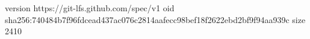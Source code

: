 version https://git-lfs.github.com/spec/v1
oid sha256:740484b7f96fdcead437ac076c2814aafecc98bef18f2622ebd2bf9f94aa939c
size 2410
